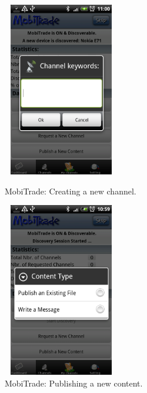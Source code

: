 \begin{figure}[!h]
\begin{minipage}[l]{0.3\linewidth}
\centering
\includegraphics[width=2in,height=3in]{Chapitre6/CreateChannel.png}
\begin{minipage}[l]{1\linewidth}
\small
\caption{MobiTrade: Creating a new channel.}
\normalsize
\label{CreatingNewChannel}
\end{minipage}
\end{minipage}
\hspace{2.1cm}
\begin{minipage}[l]{0.3\linewidth}
\centering
\includegraphics[width=2in,height=3in]{Chapitre6/PublishContent.png}
\begin{minipage}[l]{1\linewidth}
\caption{MobiTrade: Publishing a new content.}
\label{PublishNewContent}
\end{minipage}
\end{minipage}
\end{figure}


